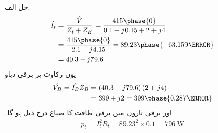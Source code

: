 حل الف:
\begin{align*}
\hat{I_t}&=\frac{\hat{V}}{Z_t+Z_B}=\frac{415\phase{0}}{0.1+j 0.15+2+j 4}\\
&=\frac{415\phase{0}}{2.1+j 4.15}=89.23\phase{-63.159\degree}\\
&=40.3-j79.6
\end{align*}
یوں رکاوٹ پر برقی دباو
\begin{align*}
\hat{V_B}=\hat{I_B} Z_B&=\left(40.3-j79.6 \right) \left( 2+j 4\right)\\
&=399+j2=399\phase{0.287\degree}
\end{align*}
اور برقی تاروں میں برقی طاقت کا ضیاع درج ذیل ہو گا۔
\begin{align*}
p_t=I_t^2 R_t=89.23^2 \times 0.1=\SI{796}{\watt}
\end{align*}

